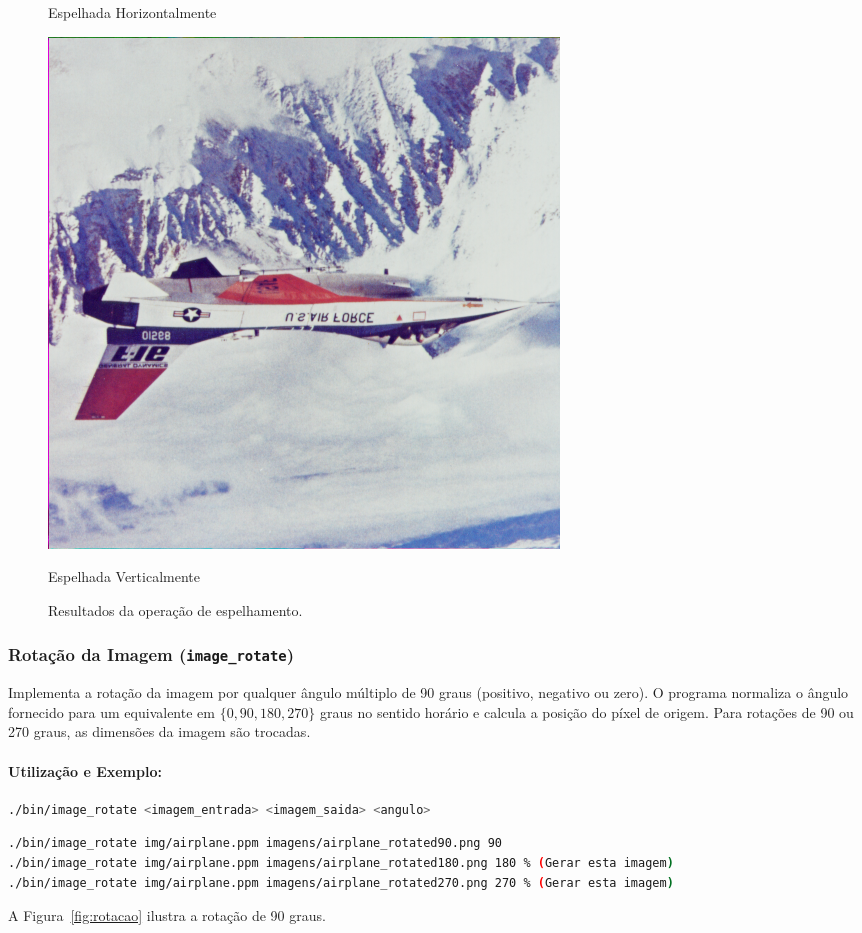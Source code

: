 \documentclass[a4paper, 11pt, portuguese]{article}
\begin{document}
\begin{figure}[htbp]
\begin{minipage}{0.32\textwidth}
    \caption*{Espelhada Horizontalmente}
\end{minipage}
\hfill
\begin{minipage}{0.32\textwidth}
    \centering
    \includegraphics[width=\textwidth]{imagens/airplane_mirror_v.png}
    \caption*{Espelhada Verticalmente}
\end{minipage}
\caption{Resultados da operação de espelhamento.}
\label{fig:espelhamento}
\end{figure}

\subsubsection{Rotação da Imagem (\texttt{image\_rotate})}
Implementa a rotação da imagem por qualquer ângulo múltiplo de 90 graus (positivo, negativo ou zero). O programa normaliza o ângulo fornecido para um equivalente em $\{0, 90, 180, 270\}$ graus no sentido horário e calcula a posição do píxel de origem. Para rotações de 90 ou 270 graus, as dimensões da imagem são trocadas.

\paragraph{Utilização e Exemplo:}
\begin{lstlisting}[language=bash, caption=Sintaxe de Uso do image\_rotate]
./bin/image_rotate <imagem_entrada> <imagem_saida> <angulo>
\end{lstlisting}
\begin{lstlisting}[language=bash]
./bin/image_rotate img/airplane.ppm imagens/airplane_rotated90.png 90
./bin/image_rotate img/airplane.ppm imagens/airplane_rotated180.png 180 % (Gerar esta imagem)
./bin/image_rotate img/airplane.ppm imagens/airplane_rotated270.png 270 % (Gerar esta imagem)
\end{lstlisting}
A Figura~\ref{fig:rotacao} ilustra a rotação de 90 graus.
\end{document}
